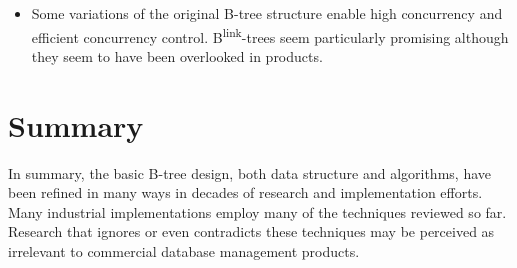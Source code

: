 \begin{itemize}
  \item
  Some variations of the original B-tree structure enable high
concurrency and efficient concurrency control.
B\textsuperscript{link}-trees seem particularly promising although they
seem to have been overlooked in products.
\end{itemize}

\hypertarget{summary}{%
\section{Summary}\label{summary}}

In summary, the basic B-tree design, both data structure and algorithms,
have been refined in many ways in decades of research and implementation
efforts. Many industrial implementations employ many of the techniques
reviewed so far. Research that ignores or even contradicts these
techniques may be perceived as irrelevant to commercial database
management products.

